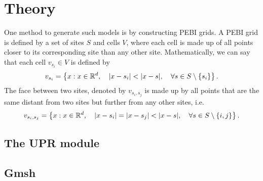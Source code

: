 \section{Theory}

One method to generate such models is by constructing PEBI grids. A PEBI grid is defined by a set of sites $S$ and cells $V$, where each cell is made up of all points closer to its corresponding site than any other site. Mathematically, we can say that each cell $v_{s_i} \in V$ is defined by
\begin{equation}
    v_{s_i} = \left\{ x : x \in \mathbb{R}^d,\quad \lvert x - s_i\rvert < \lvert x - s\rvert,\quad \forall s \in S \setminus \{s_i\} \right\}.
\end{equation}
The face between two sites, denoted by $v_{s_i, s_j}$ is made up by all points that are the same distant from two sites but further from any other sites, i.e.
\begin{equation}
    v_{s_i, s_j} = \left\{ x : x \in \mathbb{R}^d,\quad \lvert x - s_i\rvert = \lvert x - s_j\rvert < \lvert x - s\rvert,\quad \forall s \in S \setminus \{i, j\} \right\}.
\end{equation}




\subsection{The UPR module}


\subsection{Gmsh}